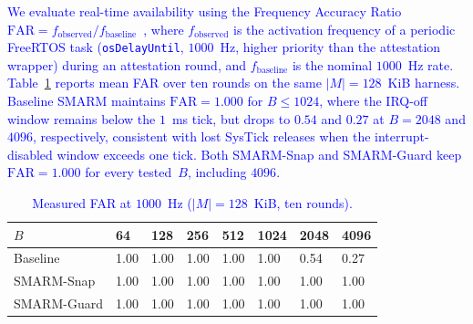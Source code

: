 \documentclass[conference]{IEEEtran}
\newcommand{\tdis}{$t_{\mathrm{disabled}}$\xspace}
\newcommand{\smarmcopy}{SMARM-Snap\xspace}
\newcommand{\smarmlock}{SMARM-Guard\xspace}
\newcommand\ben[1]{\textcolor{blue}{#1}}
\begin{document}
%

\ben{We evaluate real-time availability using the Frequency Accuracy Ratio $\mathrm{FAR}=f_{\mathrm{observed}}/f_{\mathrm{baseline}}$~\cite{smarmplus2026}, where $f_{\mathrm{observed}}$ is the activation frequency of a periodic FreeRTOS task (\texttt{osDelayUntil}, $1000$~Hz, higher priority than the attestation wrapper) during an attestation round, and $f_{\mathrm{baseline}}$ is the nominal $1000$~Hz rate. Table~\ref{tab:far} reports mean FAR over ten rounds on the same $|M|{=}128$~KiB harness. Baseline SMARM maintains $\mathrm{FAR}=1.000$ for $B\leq 1024$, where the IRQ-off window remains below the $1$~ms tick, but drops to $0.54$ and $0.27$ at $B{=}2048$ and $4096$, respectively, consistent with lost SysTick releases when the interrupt-disabled window exceeds one tick. Both \smarmcopy{} and \smarmlock{} keep $\mathrm{FAR}=1.000$ for every tested~$B$, including $4096$.}

\begin{table}[ht]
  \centering
  \caption{\ben{Measured FAR at $1000$~Hz ($|M|{=}128$~KiB, ten rounds).}}
  \label{tab:far}
  \small
  \setlength{\tabcolsep}{3.5pt}
  \begin{tabularx}{\columnwidth}{@{}lXXXXXXX@{}}
    \toprule
    \textbf{$B$} & 64 & 128 & 256 & 512 & 1024 & 2048 & 4096 \\
    \midrule
    Baseline & 1.00 & 1.00 & 1.00 & 1.00 & 1.00 & 0.54 & 0.27 \\
    \smarmcopy & 1.00 & 1.00 & 1.00 & 1.00 & 1.00 & 1.00 & 1.00 \\
    \smarmlock & 1.00 & 1.00 & 1.00 & 1.00 & 1.00 & 1.00 & 1.00 \\
    \bottomrule
  \end{tabularx}
\end{table}
\end{document}
